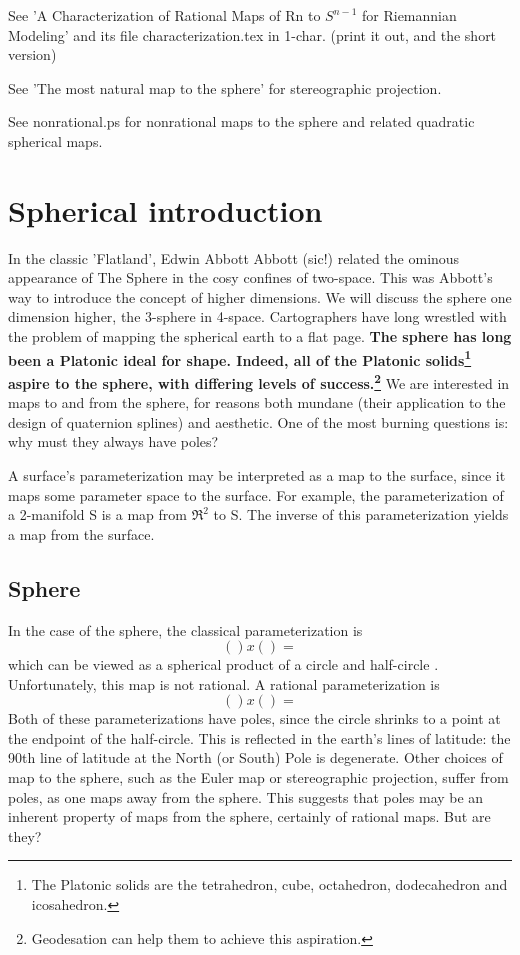 \documentclass[11pt]{article}
\begin{document}
See 'A Characterization of Rational Maps of Rn to $S^{n-1}$ for Riemannian Modeling'
and its file characterization.tex in 1-char.  (print it out, and the short version)

See 'The most natural map to the sphere' for stereographic projection.

See nonrational.ps for nonrational maps to the sphere and 
related quadratic spherical maps.

\section{Spherical introduction}

In the classic 'Flatland',
Edwin Abbott Abbott (sic!) related the ominous appearance of The Sphere in the
cosy confines of two-space.
This was Abbott's way to introduce the concept of higher dimensions.
We will discuss the sphere one dimension higher, the 3-sphere in 4-space.
Cartographers have long wrestled with the problem of mapping the spherical earth
to a flat page.
{\bf The sphere has long been a Platonic ideal for shape.
Indeed, all of the Platonic solids\footnote{The Platonic solids are the tetrahedron,
  cube, octahedron, dodecahedron and icosahedron.}
aspire to the sphere, with differing levels of success.\footnote{Geodesation can
  help them to achieve this aspiration.}
}
We are interested in maps to and from the sphere, 
for reasons both mundane (their application to the design of quaternion splines)
and aesthetic.
One of the most burning questions is: why must they always have poles?

A surface's parameterization may be interpreted as a map to the surface,
since it maps some parameter space to the surface.
For example, the parameterization of a 2-manifold S is a map from $\Re^2$ to S.
The inverse of this parameterization yields a map from the surface.

\subsection{Sphere}

In the case of the sphere, the classical parameterization is
\[
   () x () = 
\]
which can be viewed as a spherical product of a circle and half-circle \cite{barr}.
Unfortunately, this map is not rational.
A rational parameterization is 
\[
   () x () = 
\]
Both of these parameterizations have poles, since the circle shrinks to a point
at the endpoint of the half-circle.
This is reflected in the earth's lines of latitude: the 90th line of latitude at the
North (or South) Pole is degenerate.
Other choices of map to the sphere, such as the Euler map or 
stereographic projection, suffer from poles, as one maps away from the sphere.
This suggests that poles may be an inherent property of maps from the sphere,
certainly of rational maps.
But are they?
\end{document}
